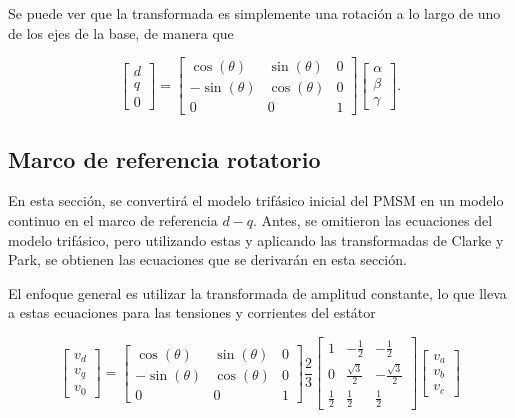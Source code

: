 Se puede ver que la transformada es simplemente una rotación a lo largo de uno de los ejes de la base, de manera que 

\begin{equation}
    \begin{bmatrix}
        d \\
        q \\
        0
    \end{bmatrix}
    =
    \begin{bmatrix}
        \cos(\theta) & \sin(\theta) & 0 \\
        -\sin(\theta) & \cos(\theta) & 0 \\
        0 & 0 & 1
    \end{bmatrix}
    \begin{bmatrix}
        \alpha \\
        \beta \\
        \gamma
    \end{bmatrix} \text{.}
\end{equation}

\subsection{Marco de referencia rotatorio}

En esta sección, se convertirá el modelo trifásico inicial del PMSM en un modelo continuo en el marco de referencia $d - q$. Antes, se omitieron las ecuaciones del modelo trifásico, pero utilizando estas y aplicando las transformadas de Clarke y Park, se obtienen las ecuaciones que se derivarán en esta sección.

El enfoque general es utilizar la transformada de amplitud constante, lo que lleva a estas ecuaciones para las tensiones y corrientes del estátor 

\begin{equation}
	\begin{bmatrix}
		v_d \\
		v_q \\
		v_0
	\end{bmatrix}
	=
	\begin{bmatrix}
		\cos(\theta) & \sin(\theta) & 0  \\
		-\sin(\theta) & \cos(\theta) & 0  \\
		0 & 0 & 1
	\end{bmatrix}
	\frac{2}{3}
	\begin{bmatrix}
		1 & -\frac{1}{2} & -\frac{1}{2} \\
		0 & \frac{\sqrt{3}}{2} & -\frac{\sqrt{3}}{2} \\
		\frac{1}{2} & \frac{1}{2} & \frac{1}{2}
	\end{bmatrix}
	\begin{bmatrix}
		v_a \\
		v_b \\
		v_c
	\end{bmatrix}
\end{equation}

